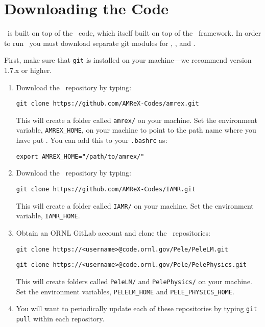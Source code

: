 
\section{Downloading the Code}

\pelelm\ is built on top of the \iamr\ code, which itself built on top of the \amrex\ framework.  In order to run
\pelelm\, you must download separate git modules for \pelelm, \iamr, and \amrex.

\vspace{.1in}

\noindent First, make sure that {\tt git} is installed on your machine---we recommend version 1.7.x or higher.

\vspace{.1in}

\begin{enumerate}

\item Download the \amrex\ repository by typing: 
\begin{verbatim}
git clone https://github.com/AMReX-Codes/amrex.git
\end{verbatim}

This will create a folder called {\tt amrex/} on your machine.
Set the environment variable, {\tt AMREX\_HOME}, on your
machine to point to the path name where you have put \amrex.
You can add this to your {\tt .bashrc} as:
\begin{verbatim}
export AMREX_HOME="/path/to/amrex/"
\end{verbatim}

\item Download the \iamr\ repository by typing: 
\begin{verbatim}
git clone https://github.com/AMReX-Codes/IAMR.git
\end{verbatim}

This will create a folder called {\tt IAMR/} on your machine.
Set the environment variable, {\tt IAMR\_HOME}.

\item Obtain an ORNL GitLab account and clone the \pele\ repositories:
\begin{verbatim}
git clone https://<username>@code.ornl.gov/Pele/PeleLM.git
\end{verbatim}
\begin{verbatim}
git clone https://<username>@code.ornl.gov/Pele/PelePhysics.git
\end{verbatim}

This will create folders called {\tt PeleLM/} and {\tt PelePhysics/} on your machine.
Set the environment variables, {\tt PELELM\_HOME} and {\tt PELE\_PHYSICS\_HOME}.

\item You will want to periodically update each of these repositories
by typing {\tt git pull} within each repository.

\end{enumerate}


